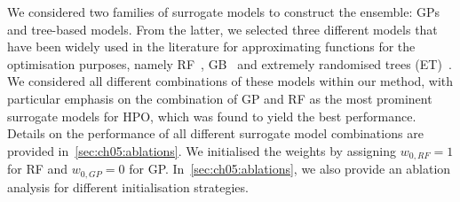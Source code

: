 We considered two families of surrogate models to construct the ensemble: GPs and tree-based models.
From the latter, we selected three different models that have been widely used in the literature for approximating functions for the optimisation purposes, namely 
RF~\citep{Breiman01}, GB~\citep{Friedman01} and extremely randomised trees (ET)~\citep{GeuEtAl06}.
We considered all different combinations of these models within our method, with particular emphasis on the combination of GP and RF as the most prominent surrogate models for HPO, which was found to yield the best performance. 
Details on the performance of all different surrogate model combinations are provided in~\cref{sec:ch05:ablations}.
We initialised the weights by assigning  $w_{0,RF}=1$ for RF and $w_{0,GP}=0$ for GP. 
In~\cref{sec:ch05:ablations}, we also provide an ablation analysis for different initialisation strategies.




